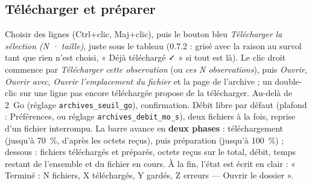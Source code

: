 \subsection{Télécharger et préparer}
Choisir des lignes (Ctrl+clic, Maj+clic), puis le bouton bleu \emph{Télécharger la sélection (N · taille)}, juste sous
le tableau (0.7.2 : grisé avec la raison au survol tant que rien n'est choisi, « Déjà téléchargé ✓ » si tout est là).
Le clic droit commence par \emph{Télécharger cette observation} (ou \emph{ces N observations}), puis \emph{Ouvrir},
\emph{Ouvrir avec}, \emph{Ouvrir l'emplacement du fichier} et la page de l'archive ; un double-clic sur une ligne pas
encore téléchargée propose de la télécharger. Au-delà de 2~Go (réglage \texttt{archives\_seuil\_go}),
confirmation. Débit libre par défaut (plafond : Préférences, ou réglage \texttt{archives\_debit\_mo\_s}), deux fichiers à la fois, reprise
d'un fichier interrompu. La barre avance en \textbf{deux phases} : téléchargement (jusqu'à 70~\%, d'après les octets
reçus), puis préparation (jusqu'à 100~\%) ; dessous : fichiers téléchargés et préparés, octets reçus sur le total,
débit, temps restant de l'ensemble et du fichier en cours. À la fin, l'état est écrit en clair : « Terminé :
N fichiers, X téléchargés, Y gardés, Z erreurs — Ouvrir le dossier ».

